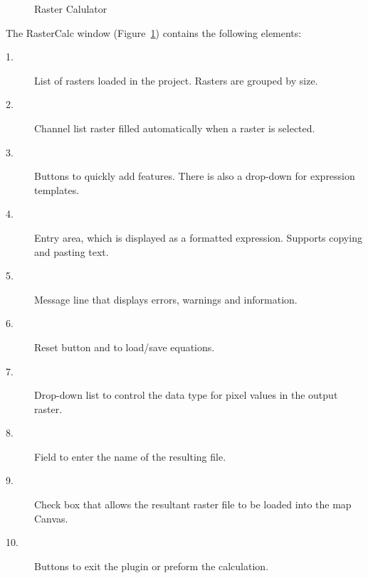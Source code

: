 \begin{figure}[h!]
  \centering
  \caption{Raster Calulator}
  \label{fig:rc_window}
\end{figure}
The RasterCalc window (Figure~\ref{fig:rc_window}) contains the following elements:
\begin{description}
	\item[\hspace{5mm} 1. ] List of rasters loaded in the project. Rasters are grouped by size.
	\item[\hspace{5mm} 2. ] Channel list raster filled automatically when a raster is selected.
	\item[\hspace{5mm} 3. ] Buttons to quickly add features. There is also a drop-down for expression templates.
	\item[\hspace{5mm} 4. ] Entry area, which is displayed as a formatted expression. Supports copying and pasting text.
	\item[\hspace{5mm} 5. ] Message line that displays errors, warnings and information.
	\item[\hspace{5mm} 6. ] Reset button and to load/save equations.
	\item[\hspace{5mm} 7. ] Drop-down list to control the data type for pixel values in the output raster.
	\item[\hspace{5mm} 8. ] Field to enter the name of the resulting file.
	\item[\hspace{5mm} 9. ] Check box that allows the resultant raster file to be loaded into the map Canvas.
	\item[\hspace{5mm} 10.] Buttons to exit the plugin or preform the calculation.
\end{description}

